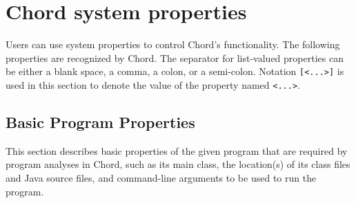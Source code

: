 
\section{Chord system properties}
\label{sec:chord-sysprops}

Users can use system properties to control Chord's functionality.
The following properties are recognized by Chord.
The separator for list-valued properties can be either a blank space, a comma, a colon, or a semi-colon.
Notation {\tt [<...>]} is used in this section to denote the value of the property named {\tt <...>}.

\subsection{Basic Program Properties}

This section describes basic properties of the given program that are required by program analyses in Chord,
such as its main class, the location(s) of its class files and Java source files, and command-line arguments
to be used to run the program.

